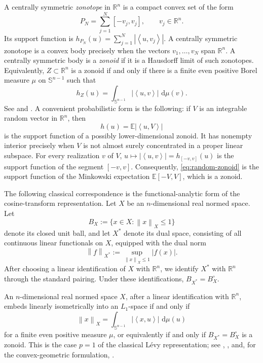\documentclass[11pt]{article}
\theoremstyle{definition}
\theoremstyle{remark}
\newcommand{\R}{\mathbb R}
\newcommand{\Sph}{\mathbb S}
\newcommand{\dd}{\,\mathrm d}
\newcommand{\E}{\mathbb E}
\newcommand{\abs}[1]{\left|#1\right|}
\newcommand{\norm}[1]{\left\|#1\right\|}
\newcommand{\ip}[2]{\left\langle #1,#2\right\rangle}
\begin{document}
A centrally symmetric \emph{zonotope} in $\R^n$ is a compact convex
set of the form
\begin{equation}\label{eq:zonotope-definition}
 P_N=\sum_{j=1}^N[-v_j,v_j],
 \qquad v_j\in\R^n.
\end{equation}
Its support function is
$h_{P_N}(u)=\sum_{j=1}^N\abs{\ip{u}{v_j}}$.  A centrally symmetric
zonotope is a convex body precisely when the vectors
$v_1,\ldots,v_N$ span $\R^n$.  A centrally symmetric
body is a \emph{zonoid} if it is a Hausdorff limit of such zonotopes. 
Equivalently, $Z\subset\R^n$ is a zonoid if and only if there is a
finite even positive Borel measure $\mu$ on $\Sph^{n-1}$ such that
\begin{equation}\label{eq:cosine-transform}
 h_Z(u)=\int_{\Sph^{n-1}}\abs{\ip{u}{v}}\,\dd\mu(v).
\end{equation}
See \cite[Section~3.5]{Schneider2014} and
\cite{Bolker1969,GoodeyWeil1993}.  A convenient probabilistic form is
the following: if $V$ is an integrable random vector in $\R^n$, then
\begin{equation}\label{eq:random-zonoid}
 h(u)=\E\abs{\ip{u}{V}}
\end{equation}
is the support function of a possibly lower-dimensional zonoid.  It
has nonempty interior precisely when $V$ is not almost surely
concentrated in a proper linear subspace.   For every
realization $v$ of $V$,
$u\mapsto\abs{\ip{u}{v}}=h_{[-v,v]}(u)$ is the support function of the
segment $[-v,v]$.  Consequently, \eqref{eq:random-zonoid} is the
support function of the Minkowski expectation $\E[-V,V]$, which is a
zonoid.

The following classical correspondence is the
functional-analytic form of the cosine-transform representation. Let $X$ be an $n$-dimensional real normed space.  Let
\[
 B_X:=\{x\in X:\norm{x}_X\leq1\}
\]
denote its closed unit ball, and let $X^*$ denote its dual space,
consisting of all continuous linear functionals on $X$, equipped with
the dual norm
\[
 \norm{f}_{X^*}
 :=\sup_{\norm{x}_X\leq1}\abs{f(x)}.
\]
After choosing a linear identification of $X$ with $\R^n$, we identify
$X^*$ with $\R^n$ through the standard pairing.  Under these
identifications,
$
 B_{X^*}=B_X^\circ.
$

An 
$n$-dimensional real normed space $X$, after a linear identification
with $\R^n$, embeds linearly isometrically into an $L_1$-space if and
only if
\[
 \norm{x}_X
 =\int_{\Sph^{n-1}}\abs{\ip{x}{u}}\,\dd\mu(u)
\]
for a finite even positive measure $\mu$, or equivalently if and only
if $B_{X^*}=B_X^\circ$ is a zonoid.  This is the case $p=1$ of the
classical L\'evy representation; see
\cite[p.~189]{BenyaminiLindenstrauss2000},
\cite[Section~6.1]{Koldobsky2005}, and, for the convex-geometric
formulation, \cite[Section~3.5]{Schneider2014}.
\end{document}
